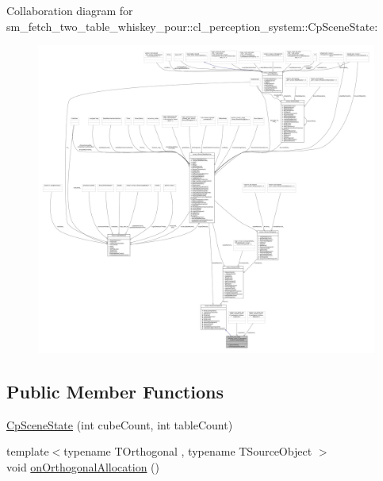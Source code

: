 Collaboration diagram for sm\+\_\+fetch\+\_\+two\+\_\+table\+\_\+whiskey\+\_\+pour\+:\+:cl\+\_\+perception\+\_\+system\+:\+:Cp\+Scene\+State\+:
\nopagebreak
\begin{figure}[H]
\begin{center}
\leavevmode
\includegraphics[width=350pt]{classsm__fetch__two__table__whiskey__pour_1_1cl__perception__system_1_1CpSceneState__coll__graph}
\end{center}
\end{figure}
\subsection*{Public Member Functions}
\begin{DoxyCompactItemize}
\item 
\hyperlink{classsm__fetch__two__table__whiskey__pour_1_1cl__perception__system_1_1CpSceneState_acb5205f7209aa6cdf8355e20b42e0fc0}{Cp\+Scene\+State} (int cube\+Count, int table\+Count)
\item 
{\footnotesize template$<$typename T\+Orthogonal , typename T\+Source\+Object $>$ }\\void \hyperlink{classsm__fetch__two__table__whiskey__pour_1_1cl__perception__system_1_1CpSceneState_a97d0dfdd9cd3adf6a93f523963a4c0a7}{on\+Orthogonal\+Allocation} ()
\end{DoxyCompactItemize}
